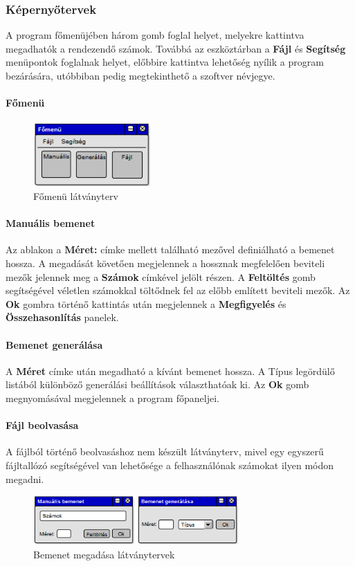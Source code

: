 \documentclass{elteikthesis}
\begin{document}
\subsubsection{Képernyőtervek}
A program főmenüjében három gomb foglal helyet, melyekre kattintva megadhatók a rendezendő számok. Továbbá az eszköztárban a \textbf{Fájl} és \textbf{Segítség} menüpontok foglalnak helyet, előbbire kattintva lehetőség nyílik a program bezárására, utóbbiban pedig megtekinthető a szoftver névjegye.
\paragraph{Főmenü}
\begin{figure}[H]
	\centering
	\includegraphics[width=0.4\textwidth]{pics/plan_mainmenu.png}
	\caption{Főmenü látványterv}
\end{figure}
\paragraph{Manuális bemenet}
Az ablakon a \textbf{Méret:} címke mellett található mezővel definiálható a bemenet hossza. A megadását követően megjelennek a hossznak megfelelően beviteli mezők jelennek meg a \textbf{Számok} címkével jelölt részen. A \textbf{Feltöltés} gomb segítségével véletlen számokkal töltődnek fel az előbb említett beviteli mezők. Az \textbf{Ok} gombra történő kattintás után megjelennek a \textbf{Megfigyelés} és \textbf{Összehasonlítás} panelek.
\paragraph{Bemenet generálása}
A \textbf{Méret} címke után megadható a kívánt bemenet hossza. A Típus legördülő listából különböző generálási beállítások választhatóak ki. Az \textbf{Ok} gomb megnyomásával megjelennek a program főpaneljei.
\paragraph{Fájl beolvasása}
A fájlból történő beolvasáshoz nem készült látványterv, mivel egy egyszerű fájltallózó segítségével van lehetősége a felhasználónak számokat ilyen módon megadni.
\begin{figure}[H]
	\centering
	\includegraphics[width=0.7\textwidth]{pics/plan_input.png}
	\caption{Bemenet megadása látványtervek}
\end{figure}
\end{document}
